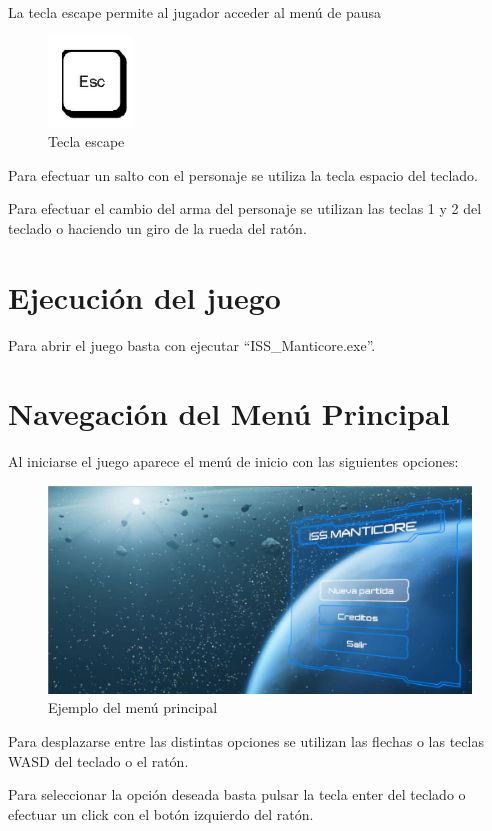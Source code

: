 La tecla escape permite al jugador acceder al menú de pausa
\begin{figure}[H]
	\centering
	\includegraphics[scale=0.50]{imagenes/escape.png}
	\caption{\label{fig:escape}Tecla escape}
\end{figure}

Para efectuar un salto con el personaje se utiliza la tecla espacio del teclado.

Para efectuar el cambio del arma del personaje se utilizan las teclas 1 y 2 del teclado o haciendo un giro de la rueda del ratón.

\section{Ejecución del juego}
Para abrir el juego basta con ejecutar ``ISS\_Manticore.exe''.

\section{Navegación del Menú Principal}
Al iniciarse el juego aparece el menú de inicio con las siguientes opciones: 

\begin{figure}[H]
	\centering
	\includegraphics[scale=0.40]{imagenes/MenuPrincipal3D1.png}
	\caption{\label{fig:EjemploMenuPrincipal3D}Ejemplo del menú principal}
\end{figure}

Para desplazarse entre las distintas opciones se utilizan las flechas o las teclas WASD del teclado o el ratón.

Para seleccionar la opción deseada basta pulsar la tecla enter del teclado o efectuar un click con el botón izquierdo del ratón.

